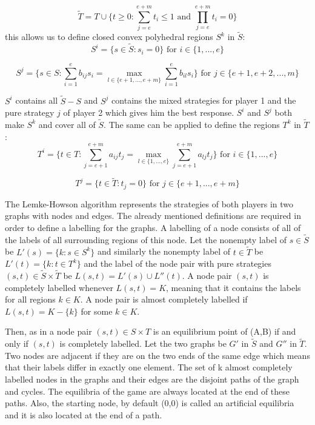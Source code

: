 \[
\tilde{T} = T \cup \{t \geq 0: \sum_{j=e}^{e+m} t_i \leq 1 \text{ and } \prod_{j=e}^{e+m} t_i = 0 \}
\]
this allows us to define closed convex polyhedral regions $S^k$ in $\tilde{S}$:
\[
S^i = \{ s \in \tilde{S}: s_i = 0 \} \text{ for } i \in \{1,...,e\}
\]

\[
S^j = \{ s \in S: \sum_{i=1}^{e} b_{ij} s_i = \max_{l \in \{e+1,...,e+m\}} \sum_{i=1}^{e} b_{il} s_i \} \text{ for } j \in \{e+1,e+2,...,m\}
\]

$S^i$ contains all $\tilde{S}-S$ and $S^j$ contains the mixed strategies for player 1 and the pure strategy $j$ of player 2 which gives him the best response. $S^i$ and $S^j$ both make $S^k$ and cover all of $\tilde{S}$. The same can be applied to define the regions $T^k$ in $\tilde{T}$:
\[ 
T^i = \{ t \in T: \sum_{j=e+1}^{e+m} a_{ij} t_j = \max_{l \in \{1,...,e\}} \sum_{j=e+1}^{e+m} a_{lj} t_j \} \text{ for } i \in \{1,...,e\} 
\]

\[
T^j = \{ t \in \tilde{T}: t_j = 0 \} \text{ for } j \in \{e+1,...,e+m\} 
\]

The Lemke-Howson algorithm represents the strategies of both players in two graphs with nodes and edges. The already mentioned definitions are required in order to define a labelling for the graphs. A labelling of a node consists of all of the labels of all surrounding regions of this node. Let the nonempty label of $s \in \tilde{S}$ be $L'(s) = \{ k: s \in S^k \}$ and similarly the nonempty label of $t \in \tilde{T}$ be $L'(t) = \{ k: t \in T^k \}$ and the label of the node pair with pure strategies $(s,t) \in \tilde{S} \times \tilde{T}$ be $L(s,t) = L'(s) \cup L''(t)$. A node pair $(s,t)$ is completely labelled whenever $L(s,t) = K$, meaning that it contains the labels for all regions $k \in K$. A node pair is almost completely labelled if $L(s,t) = K - \{k\}$ for some $k \in K$. 

Then, as in \citep{shapley1974note} a node pair $(s,t) \in S \times T$ is an equilibrium point of (A,B) if and only if $(s,t)$ is completely labelled. Let the two graphs be $G'$ in $\tilde{S}$ and $G''$ in $\tilde{T}$. Two nodes are adjacent if they are on the two ends of the same edge which means that their labels differ in exactly one element. The set of k almost completely labelled nodes in the graphs and their edges are the disjoint paths of the graph and cycles. The equilibria of the game are always located at the end of these paths. Also, the starting node, by default (0,0) is called an artificial equilibria and it is also located at the end of a path.

